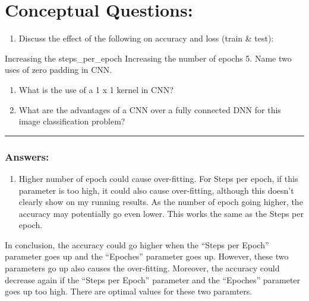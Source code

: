 \documentclass[11pt]{article}
\providecommand{\tightlist}{%
      \setlength{\itemsep}{0pt}\setlength{\parskip}{0pt}}
\begin{document}
    \hypertarget{conceptual-questions}{%
\section{Conceptual Questions:}\label{conceptual-questions}}

\begin{enumerate}
\def\labelenumi{\arabic{enumi}.}
\setcounter{enumi}{3}
\tightlist
\item
  Discuss the effect of the following on accuracy and loss (train \&
  test):
\end{enumerate}

Increasing the steps\_per\_epoch Increasing the number of epochs 5. Name
two uses of zero padding in CNN.

\begin{enumerate}
\def\labelenumi{\arabic{enumi}.}
\setcounter{enumi}{5}
\item
  What is the use of a 1 x 1 kernel in CNN?
\item
  What are the advantages of a CNN over a fully connected DNN for this
  image classification problem?
\end{enumerate}

    \begin{center}\rule{0.5\linewidth}{\linethickness}\end{center}

    \hypertarget{answers}{%
\subsubsection{Answers:}\label{answers}}

    \begin{enumerate}
\def\labelenumi{\arabic{enumi}.}
\setcounter{enumi}{3}
\tightlist
\item
  Higher number of epoch could cause over-fitting. For Steps per epoch,
  if this parameter is too high, it could also cause over-fitting,
  although this doesn't clearly show on my running results. As the
  number of epoch going higher, the accuracy may potentially go even
  lower. This works the same as the Steps per epoch.
\end{enumerate}

In conclusion, the accuracy could go higher when the ``Steps per Epoch''
parameter goes up and the ``Epoches'' parameter goes up. However, these
two parameters go up also causes the over-fitting. Moreover, the
accuracy could decrease again if the ``Steps per Epoch'' parameter and
the ``Epoches'' parameter goes up too high. There are optimal values for
these two paramters.
\end{document}
